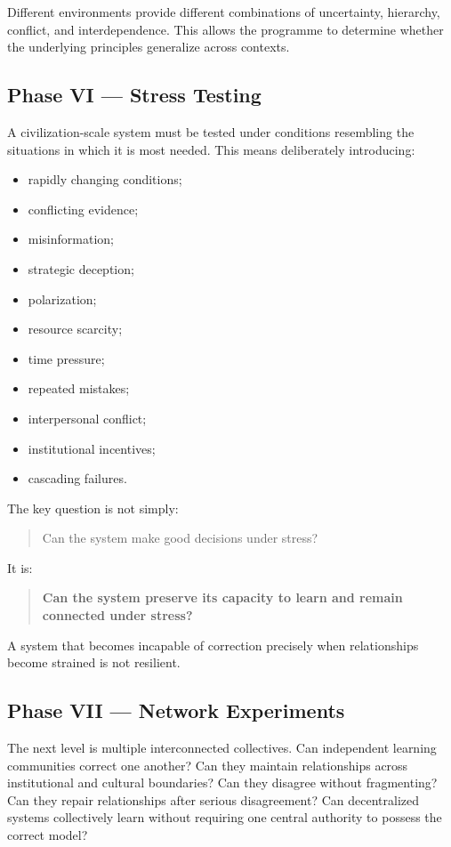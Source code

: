 \documentclass{article}
\begin{document}
Different environments provide different combinations of uncertainty, hierarchy, conflict, and interdependence. This allows the programme to determine whether the underlying principles generalize across contexts.

\subsection{Phase VI — Stress Testing}
A civilization-scale system must be tested under conditions resembling the situations in which it is most needed. This means deliberately introducing:
\begin{itemize}
    \item rapidly changing conditions;
    \item conflicting evidence;
    \item misinformation;
    \item strategic deception;
    \item polarization;
    \item resource scarcity;
    \item time pressure;
    \item repeated mistakes;
    \item interpersonal conflict;
    \item institutional incentives;
    \item cascading failures.
\end{itemize}

The key question is not simply:
\begin{quote}
    Can the system make good decisions under stress?
\end{quote}
It is:
\begin{quote}
    \textbf{Can the system preserve its capacity to learn and remain connected under stress?}
\end{quote}

A system that becomes incapable of correction precisely when relationships become strained is not resilient.

\subsection{Phase VII — Network Experiments}
The next level is multiple interconnected collectives. Can independent learning communities correct one another? Can they maintain relationships across institutional and cultural boundaries? Can they disagree without fragmenting? Can they repair relationships after serious disagreement? Can decentralized systems collectively learn without requiring one central authority to possess the correct model?
\end{document}
